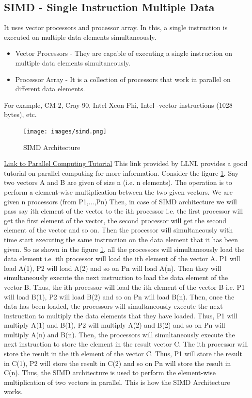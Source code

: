 \documentclass[12pt]{book}
\begin{document}
\subsection{SIMD - Single Instruction Multiple Data}
It uses vector processors and processor array. In this, a single instruction is executed on multiple data elements simultaneously. 
\begin{itemize}
    \item Vector Processors - They are capable of executing a single instruction on multiple data elements simultaneously.
    \item Processor Array - It is a collection of processors that work in parallel on different data elements.
\end{itemize}
For example, CM-2, Cray-90, Intel Xeon Phi, Intel -vector instructions (1028 bytes), etc.
\begin{figure}[H]
    \centering
    \texttt{[image: images/simd.png]}
    \caption{SIMD Architecture}
    \label{fig:simd}
\end{figure}
\href{http://www.llnl.gov/computing/tutorials/parallel_comp/}{Link to Parallel Computing Tutorial}
This link provided by LLNL provides a good tutorial on parallel computing for more information. 
Consider the figure \ref{fig:simd}. Say two vectors A and B are given of size n (i.e. n elements). The operation is to perform 
a element-wise multiplication between the two given vectors. We are given n processors (from P1,...,Pn) Then, in case of SIMD architecture we will pass 
say ith element of the vector to the ith processor i.e. the first processor will get the first element of the vector,
the second processor will get the second element of the vector and so on. Then the processor will simultaneously with time
start executing the same instruction on the data element that it has been given. So as shown in the figure \ref{fig:simd}, 
all the processors will simultaneously load the data element i.e. ith processor will load the ith element of the vector A.
P1 will load A(1), P2 will load A(2) and so on Pn will load A(n). Then they will simultaneously execute the next instruction to load the data element of the vector B. 
Thus, the ith processor will load the ith element of the vector B i.e. P1 will load B(1), P2 will load B(2) and so on Pn will load B(n). 
Then, once the data has been loaded, the processors will simultaneously execute the next instruction to multiply the data elements that they have loaded.
Thus, P1 will multiply A(1) and B(1), P2 will multiply A(2) and B(2) and so on Pn will multiply A(n) and B(n). 
Then, the processors will simultaneously execute the next instruction to store the element in the result vector C. The ith processor will store the result in the ith element of the vector C.
Thus, P1 will store the result in C(1), P2 will store the result in C(2) and so on Pn will store the result in C(n).
Thus, the SIMD architecture is used to perform the element-wise multiplication of two vectors in parallel. This is how the SIMD Architecture works.
\end{document}

